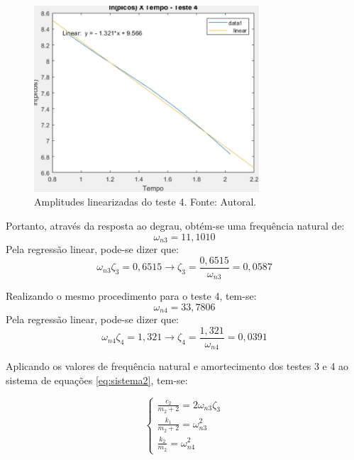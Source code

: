 \documentclass{ifacconf}
\begin{document}
\begin{figure}[!htb]
  \begin{center}
  \includegraphics[width=8.4cm]{figures/regressao_teste_4.png}    %
  \caption{Amplitudes linearizadas do teste 4. Fonte: Autoral.} 
  \label{fig:regressao_teste_4}
  \end{center}
\end{figure}
Portanto, através da resposta ao degrau, obtém-se uma frequência natural de:
\begin{equation}
    \omega_{n3} = 11,1010
\end{equation}
Pela regressão linear, pode-se dizer que:
\begin{equation}
    \omega_{n3} \zeta_3 = 0,6515 \rightarrow \zeta_3 = \frac{0,6515}{\omega_{n3}} = 0,0587
\end{equation}

Realizando o mesmo procedimento para o teste 4, tem-se:
\begin{equation}
    \omega_{n4} = 33,7806
\end{equation}
Pela regressão linear, pode-se dizer que:
\begin{equation}
    \omega_{n4} \zeta_4 = 1,321 \rightarrow \zeta_4 = \frac{1,321}{\omega_{n4}} = 0,0391
\end{equation}

Aplicando os valores de frequência natural e amortecimento dos testes 3 e 4 ao sistema de equações \ref{eq:sistema2}, tem-se:

\begin{equation}
  \left\{
\begin{array}{lr}
  \frac{c_2}{m_2 + 2} = 2\omega_{n3} \zeta_3 \\
  \frac{k_1}{m_2 + 2} = \omega_{n3}^2 \\
  \frac{k_2}{m_2} = \omega_{n4}^2
\end{array}
\right.
\end{equation}
\end{document}
